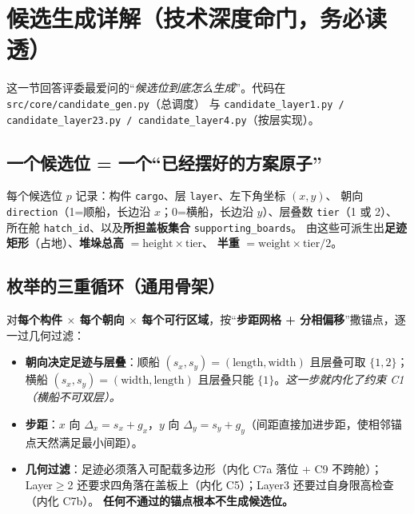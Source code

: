 \documentclass[11pt]{ctexart}
\newcommand{\code}[1]{\texttt{#1}}
\begin{document}
\section{候选生成详解（技术深度命门，务必读透）}

这一节回答评委最爱问的“\emph{候选位到底怎么生成}”。代码在 \code{src/core/candidate\_gen.py}（总调度）
与 \code{candidate\_layer1.py / candidate\_layer23.py / candidate\_layer4.py}（按层实现）。

\subsection{一个候选位 = 一个“已经摆好的方案原子”}
每个候选位 $p$ 记录：构件 \code{cargo}、层 \code{layer}、左下角坐标 $(x,y)$、
朝向 \code{direction}（1=顺船，长边沿 $x$；0=横船，长边沿 $y$）、层叠数 \code{tier}（1 或 2）、
所在舱 \code{hatch\_id}、以及\textbf{所担盖板集合} \code{supporting\_boards}。
由这些可派生出\textbf{足迹矩形}（占地）、\textbf{堆垛总高} $=\text{height}\times\text{tier}$、
\textbf{半重} $=\text{weight}\times\text{tier}/2$。

\subsection{枚举的三重循环（通用骨架）}
对\textbf{每个构件 $\times$ 每个朝向 $\times$ 每个可行区域}，按“\textbf{步距网格 + 分相偏移}”撒锚点，逐一过几何过滤：
\begin{itemize}[leftmargin=1.8em,itemsep=2pt]
  \item \textbf{朝向决定足迹与层叠}：顺船 $(s_x,s_y)=(\text{length},\text{width})$ 且层叠可取 $\{1,2\}$；
  横船 $(s_x,s_y)=(\text{width},\text{length})$ 且层叠只能 $\{1\}$。\emph{这一步就内化了约束 C1（横船不可双层）。}
  \item \textbf{步距}：$x$ 向 $\Delta_x=s_x+g_x$，$y$ 向 $\Delta_y=s_y+g_y$（间距直接加进步距，使相邻锚点天然满足最小间距）。
  \item \textbf{几何过滤}：足迹必须落入可配载多边形（内化 C7a 落位 + C9 不跨舱）；
  Layer$\ge$2 还要求四角落在盖板上（内化 C5）；Layer3 还要过自身限高检查（内化 C7b）。
  \textbf{任何不通过的锚点根本不生成候选位。}
\end{itemize}
\end{document}
